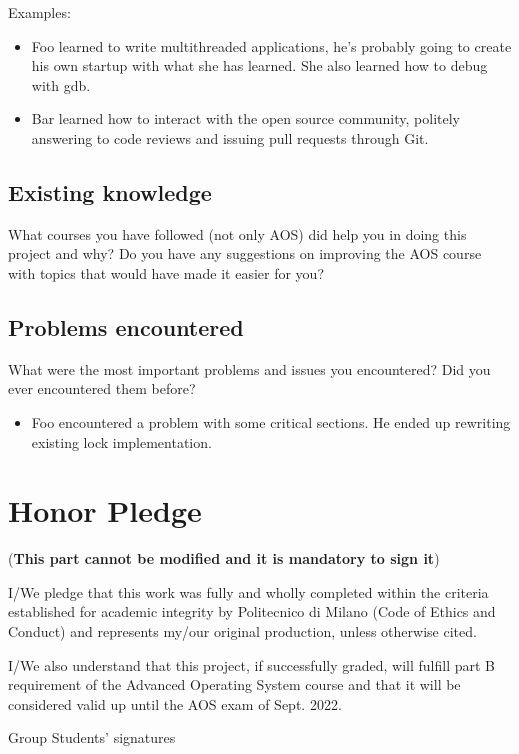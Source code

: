 \documentclass[10pt,a4]{article}
\begin{document}
Examples:

\begin{itemize}
\item Foo learned to write multithreaded applications, he's probably going to
  create his own startup with what she has learned. She also learned how to
  debug with gdb.
\item Bar learned how to interact with the open source community, politely
  answering to code reviews and issuing pull requests through Git.
\end{itemize}

\subsection{Existing knowledge}
What courses you have followed (not only AOS) did help you in doing this project
and why? Do you have any suggestions on improving the AOS course with topics
that would have made it easier for you?

\subsection{Problems encountered}
What were the most important problems and issues you encountered? Did you ever
encountered them before? 

\begin{itemize}
\item Foo encountered a problem with some critical sections. He ended up
  rewriting existing lock implementation.
\end{itemize}

\section{Honor Pledge}
(\textbf{This part cannot be modified and it is mandatory to sign it})

I/We pledge that this work was fully and wholly completed within the criteria
established for academic integrity by Politecnico di Milano (Code of Ethics and
Conduct) and represents my/our original production, unless otherwise cited.

I/We also understand that this project, if successfully graded,  will fulfill part B requirement of the
Advanced Operating System course and that it will be considered valid up until
the AOS exam of Sept. 2022. 

\begin{flushright}
Group Students' signatures
\end{flushright}
\end{document}
